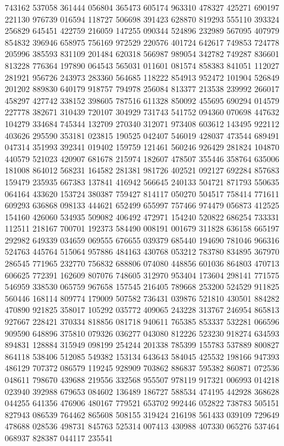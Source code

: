 {743162 537058 361444 056804 365473 605174 963310 478327 425271 690197 221130%
976739 016594 118727 506698 391423 628870 819293 555110 393324 256829 645451%
422759 216059 147255 090344 524896 232989 567095 407979 854832 396946 658975%
756169 972529 220576 401724 642617 749853 724778 205996 385593 831109 201484%
620318 566987 989054 342782 749287 836601 813228 776364 197890 064543 565031%
011601 081574 858383 841051 112027 281921 956726 243973 283360 564685 118222%
854913 952472 101904 526849 201202 889830 640179 918757 794978 256084 813377%
213538 239992 266017 458297 427742 338152 398605 787516 611328 850092 455695%
690294 014579 227778 382671 310439 720107 304929 731743 541752 094360 070698%
447632 104279 334684 745344 132709 270340 312071 973408 603612 143495 922112%
403626 295590 353181 023815 190525 042407 546019 428037 473544 689491 047314%
351993 392341 019402 159759 121461 560246 926429 281824 104870 440579 521023%
420907 681678 215974 182607 478507 355446 358764 635006 181008 864012 568231%
164582 281381 981726 402521 092127 692284 857683 159479 235935 667383 137841%
416942 566645 240133 504721 871793 550635 064164 433620 153724 380387 759427%
814117 050270 504517 758414 771611 609293 636868 098133 444621 652499 655997%
757466 974479 056873 412525 154160 426060 534935 509082 406492 472971 154240%
520822 686254 733331 112511 218167 700701 192373 584490 008191 001679 311828%
636158 665197 292982 649339 034659 069555 676655 039379 685440 194690 781046%
966316 524763 445764 515064 957886 484163 430768 053212 783780 834895 367970%
286545 771965 232770 756832 688806 074080 448856 601036 864803 470713 606625%
772391 162609 807076 748605 312970 953404 173604 298141 771575 546959 338530%
065759 967658 157545 216405 789668 253200 524529 911825 560446 168114 809774%
179009 507582 736431 039876 521810 430501 884282 470890 921825 358017 105292%
035772 409065 243228 313767 246954 865813 927667 228421 370334 818856 081718%
940611 765385 853337 532281 066596 909590 648896 375810 079326 036277 043080%
812226 523230 918274 634593 894831 128884 315949 098199 254244 201338 785399%
155783 537889 800827 864118 538406 512085 549382 153134 643643 584045 425532%
198166 947393 486129 707372 086579 119245 928909 703862 886837 595382 860871%
072536 048611 798670 439688 219556 332568 955507 978119 917321 006993 014218%
023940 392988 679653 084602 136489 186727 588534 474195 442928 368628 044255%
641356 476906 480167 779521 653702 992446 052822 738783 505151 827943 086539%
764462 865608 508155 319424 216198 561433 039109 729649 478688 028536 498731%
845763 525314 007413 430988 407330 065276 537464 068937 828387 044117 235541%
}
